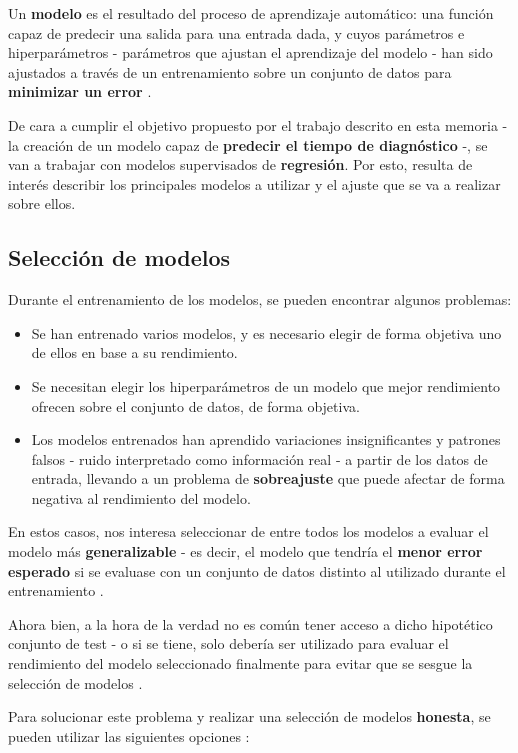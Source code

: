 Un \textbf{modelo} es el resultado del proceso de aprendizaje automático: una función capaz de predecir una salida para una entrada dada, y cuyos parámetros e hiperparámetros - parámetros que ajustan el aprendizaje del modelo - han sido ajustados a través de un entrenamiento sobre un conjunto de datos para \textbf{minimizar un error} \cite{Burkov2019TheHM}. 

De cara a cumplir el objetivo propuesto por el trabajo descrito en esta memoria - la creación de un modelo capaz de \textbf{predecir el tiempo de diagnóstico} -, se van a trabajar con modelos supervisados de \textbf{regresión}. Por esto, resulta de interés describir los principales modelos a utilizar y el ajuste que se va a realizar sobre ellos.

\subsection{Selección de modelos}

Durante el entrenamiento de los modelos, se pueden encontrar algunos problemas:
\begin{itemize}
	\item Se han entrenado varios modelos, y es necesario elegir de forma objetiva uno de ellos en base a su rendimiento.
	\item Se necesitan elegir los hiperparámetros de un modelo que mejor rendimiento ofrecen sobre el conjunto de datos, de forma objetiva.
	\item Los modelos entrenados han aprendido variaciones insignificantes y patrones falsos - ruido interpretado como información real - a partir de los datos de entrada, llevando a un problema de \textbf{sobreajuste} \cite{mlprobabilistic} que puede afectar de forma negativa al rendimiento del modelo.
\end{itemize}

En estos casos, nos interesa seleccionar de entre todos los modelos a evaluar el modelo más \textbf{generalizable} - es decir, el modelo que tendría el \textbf{menor error esperado} si se evaluase con un conjunto de datos distinto al utilizado durante el entrenamiento \cite{mlprobabilistic}. 

Ahora bien, a la hora de la verdad no es común tener acceso a dicho hipotético conjunto de test - o si se tiene, solo debería ser utilizado para evaluar el rendimiento del modelo seleccionado finalmente para evitar que se sesgue la selección de modelos \cite{aima}. 

Para solucionar este problema y realizar una selección de modelos \textbf{honesta}, se pueden utilizar las siguientes opciones \cite{mlprobabilistic}:

